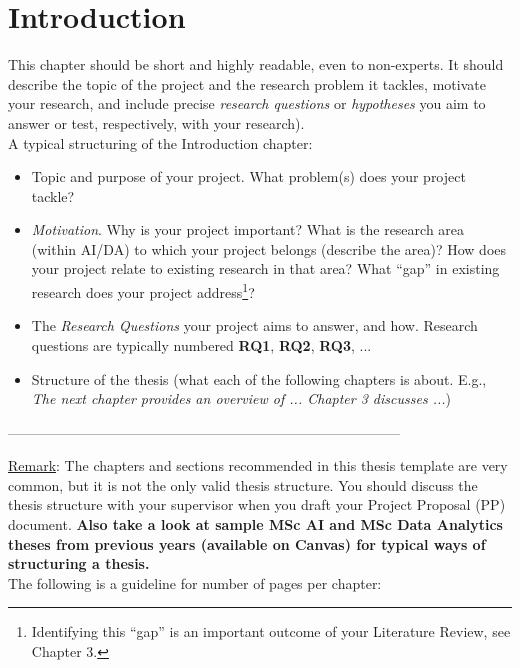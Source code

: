 \documentclass[a4paper,12pt]{Classes/RoboticsLaTeX}
\begin{document}
	
	\mainmatter
	
	
	\chapter{Introduction}
	\label{chap:introduction}
	
	This chapter should be short and highly readable, even to non-experts. It should describe the topic of the project and the research problem it tackles, motivate your research, and include precise \textit{research questions} or \textit{hypotheses} you aim to answer or test, respectively, with your research).\\
	
	\noindent A typical structuring of the Introduction chapter:
	\begin{itemize}
		\item Topic and purpose of your project. What problem(s) does your project tackle? 
		\item \textit{Motivation}. Why is your project important? What is the research area (within AI/DA) to which your project belongs (describe the area)? How does your project relate to existing research in that area? What ``gap'' in existing research does your project address\footnote{Identifying this ``gap'' is an important outcome of your Literature Review, see Chapter 3.}?
		\item The \textit{Research Questions} your project aims to answer, and how. Research questions are typically numbered \textbf{RQ1}, \textbf{RQ2}, \textbf{RQ3}, ...
		\item Structure of the thesis (what each of the following chapters is about. E.g., {\em The next chapter provides an overview of ... Chapter 3 discusses ...})
	\end{itemize}
	
	
	------------------------------------------------------------------------------------
	
	\underline{Remark}: The chapters and sections recommended in this thesis template are very common, but it is not the only valid thesis structure. You should discuss the thesis structure with your supervisor when you draft your Project Proposal (PP) document. \textbf{Also take a look at sample MSc AI and MSc Data Analytics theses from previous years (available on Canvas) for typical ways of structuring a thesis.}\\
	
	The following is a guideline for number of pages per chapter:
	
\end{document}
